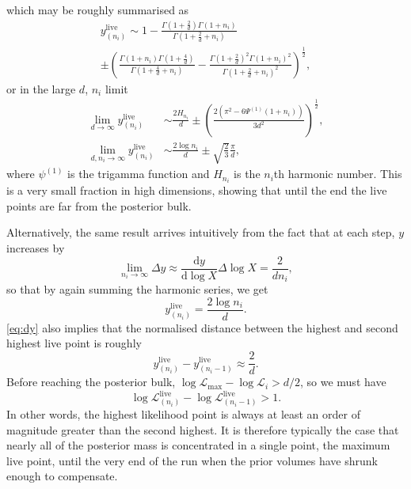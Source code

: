 \documentclass[usenatbib]{mnras}
\newcommand{\nlive}{n_i}
\newcommand{\Like}{\mathcal{L}}
\newcommand{\logLmax}{\log \Like_\mathrm{max}}
\begin{document}
which may be roughly summarised as
\begin{multline}
    y_{(n_i)}^\mathrm{live} \sim 1-\frac{\Gamma(1+\frac{2}{d})\Gamma(1+n_i)}{\Gamma(1+\frac{2}{d}+n_i)} \\
     \pm \left( \frac{\Gamma(1+n_i)\Gamma(1+\frac{4}{d})}{\Gamma(1+\frac{4}{d}+n_i)} - \frac{\Gamma(1+\frac{2}{d})^2 \Gamma(1+n_i)^2}{\Gamma(1+\frac{2}{d}+n_i)^2}\right)^{\frac{1}{2}},
    \label{eq:ymax}
\end{multline}
or in the large $d$, $n_i$ limit
\begin{align}
    \lim_{d\to\infty} y_{(n_i)}^\mathrm{live} &\sim \frac{2H_{n_i}}{d} \pm \left(\frac{2(\pi^2 - 6\Psi^{(1)}(1+n_i))}{3d^2}\right)^{\frac{1}{2}},
    \label{eq:ymaxd}\\
    \lim_{d,n_i\to\infty} y_{(n_i)}^\mathrm{live} &\sim \frac{2\log n_i}{d} \pm \sqrt{\frac{2}{3}}\frac{\pi}{d},
    \label{eq:ymaxdn}
\end{align}
where $\psi^{(1)}$ is the trigamma function and $H_{n_i}$ is the $n_i$th harmonic number. This is a very small fraction in high dimensions, showing that until the end the live points are far from the posterior bulk. 
\par
Alternatively, the same result arrives intuitively from the fact that at each step, $y$ increases by  
\begin{equation}\label{eq:dy}
    \lim_{\nlive \to \infty}\Delta y \approx \frac{\mathrm{d} y}{\mathrm{d}\log X} \Delta \log X = \frac{2}{d \nlive}, 
\end{equation}
so that by again summing the harmonic series, we get
\begin{equation}
    y_{(\nlive)}^{\mathrm{live}} = \frac{2\log \nlive}{d}.
\end{equation}
\cref{eq:dy} also implies that the normalised distance between the highest and second highest live point is roughly 
\begin{equation}
    y_{(\nlive)}^{\mathrm{live}} - y_{(\nlive - 1)}^{\mathrm{live}} \approx \frac{2}{d}.
\end{equation}
Before reaching the posterior bulk, $\logLmax - \log\Like_i > d/2$, so we must have
\begin{equation}
    \log \Like^{\mathrm{live}}_{(\nlive)} - \log \Like^\mathrm{live}_{(\nlive - 1)} > 1.
\end{equation}
In other words, the highest likelihood point is always at least an order of magnitude greater than the second highest. It is therefore typically the case that nearly all of the posterior mass is concentrated in a single point, the maximum live point, until the very end of the run when the prior volumes have shrunk enough to compensate.
\end{document}
